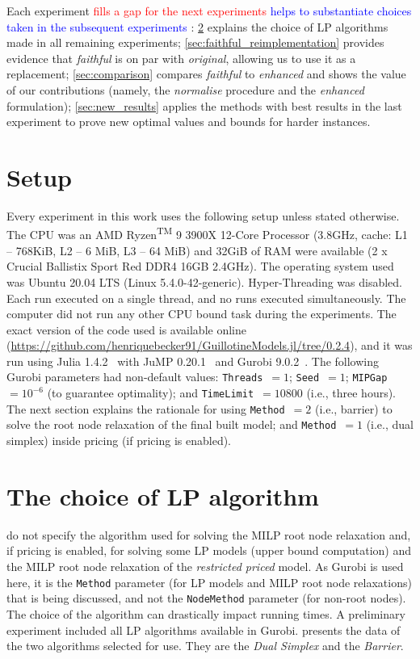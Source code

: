 \documentclass[ppgc,tese,english,formais,babel]{iiufrgs}
\newif\iffinalversion
\newcommand{\newtext}[1]{\iffinalversion%
#1%
\else%
\textcolor{blue}{#1}%
\fi%
}
\newcommand{\oldtext}[1]{\iffinalversion%
\else%
\textcolor{red}{#1}%
\fi%
}
\begin{document}
Each experiment \oldtext{fills a gap for the next experiments}\newtext{helps to substantiate choices taken in the subsequent experiments}:
\cref{sec:lp_method} explains the choice of LP algorithms made in all remaining experiments;
\cref{sec:faithful_reimplementation} provides evidence that \emph{faithful} is on par with \emph{original}, allowing us to use it as a replacement;
\cref{sec:comparison} compares \emph{faithful} to \emph{enhanced} and shows the value of our contributions (namely, the \emph{normalise} procedure and the \emph{enhanced} formulation);
\cref{sec:new_results} applies the methods with best results in the last experiment to prove new optimal values and bounds for harder instances.

\section{Setup}
\label{sec:setup}

Every experiment in this work uses the following setup unless stated otherwise.
The CPU was an AMD\textsuperscript{\textregistered} Ryzen\textsuperscript{TM} 9 3900X 12-Core Processor (3.8GHz, cache: L1 -- 768KiB, L2 -- 6 MiB, L3 -- 64 MiB) and 32GiB of RAM were available (2 x Crucial Ballistix Sport Red DDR4 16GB 2.4GHz).
The operating system used was Ubuntu 20.04 LTS (Linux 5.4.0-42-generic).
Hyper-Threading was disabled.
Each run executed on a single thread, and no runs executed simultaneously.
The computer did not run any other CPU bound task during the experiments.
The exact version of the code used is available online (\url{https://github.com/henriquebecker91/GuillotineModels.jl/tree/0.2.4}), and it was run using Julia 1.4.2~\citep{julia} with JuMP 0.20.1~\citep{JuMP} and Gurobi 9.0.2~\citep{gurobi}.
The following Gurobi parameters had non-default values: \verb+Threads+~\(= 1\); \verb+Seed+~\(= 1\); \verb+MIPGap+~\(= 10^{-6}\) (to guarantee optimality); and \verb+TimeLimit+~\(= 10800\) (i.e., three hours).
The next section explains the rationale for using \verb+Method+~\(= 2\) (i.e., barrier) to solve the root node relaxation of the final built model; and \verb+Method+~\(= 1\) (i.e., dual simplex) inside pricing (if pricing is enabled).

\section{The choice of LP algorithm}
\label{sec:lp_method}

\citet{dimitri_thesis} do not specify the algorithm used for solving the MILP root node relaxation and, if pricing is enabled, for solving some LP models (upper bound computation) and the MILP root node relaxation of the \emph{restricted priced} model.
As Gurobi is used here, it is the \verb+Method+ parameter (for LP models and MILP root node relaxations) that is being discussed, and not the \verb+NodeMethod+ parameter (for non-root nodes).
The choice of the algorithm can drastically impact running times.
A preliminary experiment included all LP algorithms available in Gurobi.
 presents the data of the two algorithms selected for use.
They are the \emph{Dual Simplex} and the \emph{Barrier}.
\end{document}
